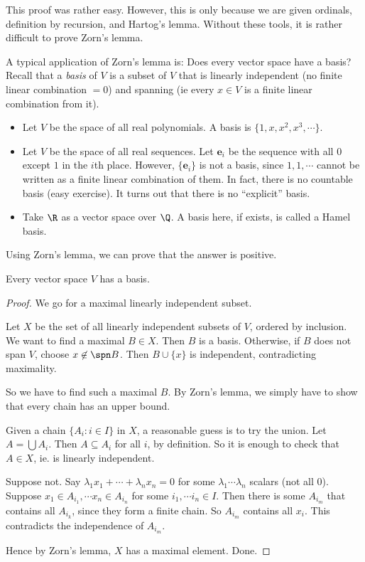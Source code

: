 \documentclass[a4paper]{article}
\begin{document}
This proof was rather easy. However, this is only because we are given ordinals, definition by recursion, and Hartog's lemma. Without these tools, it is rather difficult to prove Zorn's lemma.

A typical application of Zorn's lemma is: Does every vector space have a basis? Recall that a \emph{basis} of $V$ is a subset of $V$ that is linearly independent (no finite linear combination $= 0$) and spanning (ie every $x\in V$ is a finite linear combination from it).

\begin{eg}\leavevmode
  \begin{itemize}
    \item Let $V$ be the space of all real polynomials. A basis is $\{1, x, x^2, x^3, \cdots\}$.
    \item Let $V$ be the space of all real sequences. Let $\mathbf{e}_i$ be the sequence with all $0$ except $1$ in the $i$th place. However, $\{\mathbf{e}_i\}$ is not a basis, since $1, 1, \cdots$ cannot be written as a finite linear combination of them. In fact, there is no countable basis (easy exercise). It turns out that there is no ``explicit'' basis.
    \item Take $\R$ as a vector space over $\Q$. A basis here, if exists, is called a Hamel basis.
  \end{itemize}
\end{eg}

Using Zorn's lemma, we can prove that the answer is positive.
\begin{thm}
  Every vector space $V$ has a basis.
\end{thm}

\begin{proof}
  We go for a maximal linearly independent subset.

  Let $X$ be the set of all linearly independent subsets of $V$, ordered by inclusion. We want to find a maximal $B\in X$. Then $B$ is a basis. Otherwise, if $B$ does not span $V$, choose $x\not\in \spn B$. Then $B\cup \{x\}$ is independent, contradicting maximality.

  So we have to find such a maximal $B$. By Zorn's lemma, we simply have to show that every chain has an upper bound.

  Given a chain $\{A_i: i\in I\}$ in $X$, a reasonable guess is to try the union. Let $A = \bigcup A_i$. Then $A\subseteq A_i$ for all $i$, by definition. So it is enough to check that $A\in X$, ie. is linearly independent.

  Suppose not. Say $\lambda_1x_1 + \cdots + \lambda_nx_n = 0$ for some $\lambda_1 \cdots \lambda_n$ scalars (not all $0$). Suppose $x_1 \in A_{i_1}, \cdots x_n \in A_{i_n}$ for some $i_1, \cdots i_n \in I$. Then there is some $A_{i_m}$ that contains all $A_{i_k}$, since they form a finite chain. So $A_{i_m}$ contains all $x_i$. This contradicts the independence of $A_{i_m}$.

  Hence by Zorn's lemma, $X$ has a maximal element. Done.
\end{proof}
\end{document}
